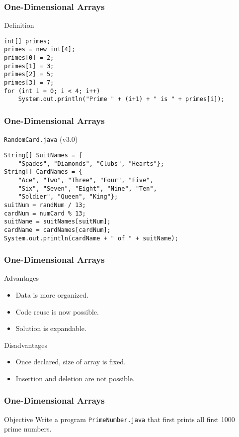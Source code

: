 \documentclass[10pt, compress]{beamer}
\begin{document}
\begin{frame}[fragile]
	\frametitle{One-Dimensional Arrays}
	\begin{block}{Definition}
		\begin{verbatim}
int[] primes;
primes = new int[4];
primes[0] = 2;
primes[1] = 3;
primes[2] = 5;
primes[3] = 7;
for (int i = 0; i < 4; i++)
	System.out.println("Prime " + (i+1) + " is " + primes[i]);
		\end{verbatim}
	\end{block}
\end{frame}

\begin{frame}[fragile]
	\frametitle{One-Dimensional Arrays}
	\begin{block}{\texttt{RandomCard.java} (v3.0)}
		\begin{verbatim}
String[] SuitNames = {
	"Spades", "Diamonds", "Clubs", "Hearts"};
String[] CardNames = {
	"Ace", "Two", "Three", "Four", "Five",
	"Six", "Seven", "Eight", "Nine", "Ten",
	"Soldier", "Queen", "King"};
suitNum = randNum / 13;
cardNum = numCard % 13;
suitName = suitNames[suitNum];
cardName = cardNames[cardNum];
System.out.println(cardName + " of " + suitName);
		\end{verbatim}
	\end{block}
\end{frame}

\begin{frame}[fragile]
	\frametitle{One-Dimensional Arrays}
	\begin{block}{Advantages}
		\begin{itemize}
			\item[] Data is more organized.
			\item[] Code reuse is now possible.
			\item[] Solution is expandable.
		\end{itemize}
	\end{block}
	\begin{block}{Disadvantages}
		\begin{itemize}
			\item[] Once declared, size of array is fixed.
			\item[] Insertion and deletion are not possible.
		\end{itemize}
	\end{block}
\end{frame}

\begin{frame}[fragile]
	\frametitle{One-Dimensional Arrays}
	\begin{block}{Objective}
		Write a program \texttt{PrimeNumber.java} that first prints all first 1000 prime numbers.
	\end{block}
\end{frame}
\end{document}
